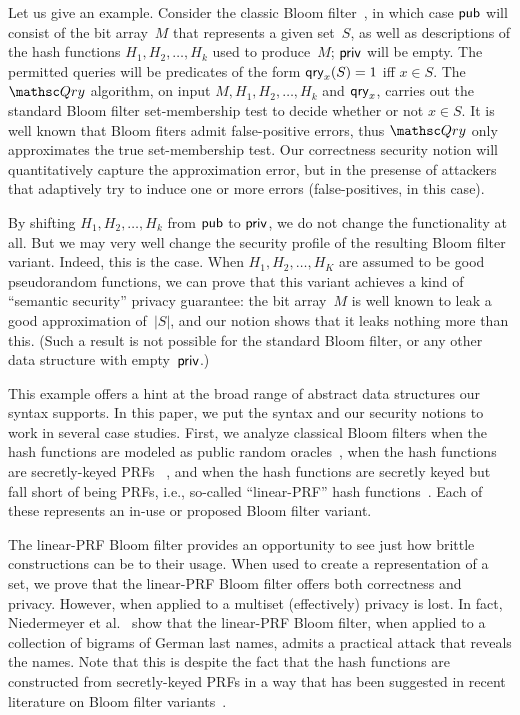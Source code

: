 Let us give an example.  Consider the classic Bloom filter~\cite{bloom1970space}, in which case ${\sf pub}$ will consist of the bit array~$M$ that represents a given set~$S$, as well as descriptions of the hash functions $H_1,H_2,\ldots,H_k$ used to produce~$M$; ${\sf priv}$ will be empty.  The permitted queries will be predicates of the form $\mathsf{qry}_x(S)=1$ iff $x \in S$. The~$\Qry$ algorithm, on input $M,H_1,H_2,\ldots,H_k$ and $\mathsf{qry}_x$, carries out the standard Bloom filter set-membership test to decide whether or not $x \in S$.  It is well known that Bloom fiters admit false-positive errors, thus $\Qry$ only approximates the true set-membership test.  Our correctness security notion will quantitatively capture the approximation error, but in the presense of attackers that adaptively try to induce one or more errors (false-positives, in this case).  

By shifting $H_1,H_2,\ldots,H_k$ from ${\sf pub}$ to ${\sf priv}$, we do not change the functionality at all.  But we may very well change the security profile of the resulting Bloom filter variant.  Indeed, this is the case.  When $H_1,H_2,\ldots,H_K$ are assumed to be good pseudorandom functions, we can prove that this variant achieves a kind of ``semantic security'' privacy guarantee: the bit array~$M$ is well known to leak a good approximation of~$|S|$, and our notion shows that it leaks nothing more than this.  (Such a result is not possible for the standard Bloom filter, or any other data structure with empty~${\sf priv}$.)

This example offers a hint at the broad range of abstract data structures our syntax supports.  In this paper, we put the syntax and our security notions to work in several case studies.  First, we analyze classical Bloom filters when the hash functions are modeled as public random oracles~\cite{broder2004network}, when the hash functions are secretly-keyed PRFs ~\cite{niedermeyer2014cryptanalysis,naor2015bloom}, and when the hash functions are secretly keyed but fall short of being PRFs, i.e., so-called ``linear-PRF'' hash functions~\cite{kirsch2006less,niedermeyer2014cryptanalysis}.  Each of these represents an in-use or proposed Bloom filter variant.  

The linear-PRF Bloom filter provides an opportunity to see just how brittle constructions can be to their usage.  When used to create a representation of a set, we prove that the linear-PRF Bloom filter offers both correctness and privacy.  However, when applied to a multiset (effectively) privacy is lost.  In fact, Niedermeyer et al.~\cite{niedermeyer2014cryptanalysis} show that the linear-PRF Bloom filter, when applied to a collection of bigrams of German last names, admits a practical attack that reveals the names.  Note that this is despite the fact that the hash functions are constructed from secretly-keyed PRFs in a way that has been suggested in recent literature on Bloom filter variants~\cite{kirsch2006less}.  

